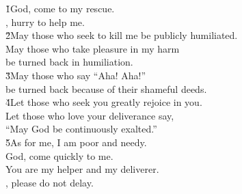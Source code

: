 
\begin{poetry}
\poeml \v{1}God, come to my rescue. \\
\poemll    {}, hurry to help me. \\
\poeml \v{2}May those who seek to kill me be publicly humiliated. \\
\poemll    May those who take pleasure in my harm \\
\poemlll       be turned back in humiliation. \\
\poeml \v{3}May those who say ``Aha! Aha!'' \\
\poemll    be turned back because of their shameful deeds. \\
\poeml \v{4}Let those who seek you greatly rejoice in you. \\
\poemll    Let those who love your deliverance say, \\
\poemlll       ``May God be continuously exalted.'' \\
\poeml \v{5}As for me, I am poor and needy. \\
\poemll    God, come quickly to me. \\
\poeml You are my helper and my deliverer. \\
\poemll    {}, please do not delay.
\end{poetry}

